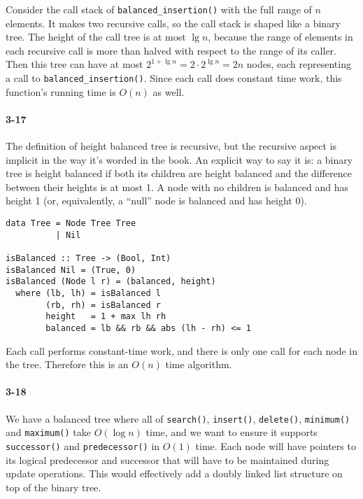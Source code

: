 \documentclass{report}
\begin{document}
Consider the call stack of \lstinline!balanced_insertion()! with the full range of $n$
elements. It makes two recursive calls, so the call stack is shaped like
a binary tree. The height of the call tree is at most $\lg n$, because the range of
elements in each recursive call is more than halved with respect to the range of its
caller. Then this tree can have at most $2^{1+\lg n} = 2\cdot 2^{\lg n} = 2n$ nodes, each
representing a call to \lstinline!balanced_insertion()!. Since each call does constant time work, this function's running time is $O(n)$ as well.

\paragraph{3-17} The definition of height balanced tree is recursive, but the recursive
aspect is implicit in the way it's worded in the book. An explicit way to say it is: a
binary tree is height balanced if both its children are height balanced and the difference
between their heights is at most 1. A node with no children is balanced and has height 1
(or, equivalently, a ``null'' node is balanced and has height 0).

\begin{lstlisting}
data Tree = Node Tree Tree
          | Nil

isBalanced :: Tree -> (Bool, Int)
isBalanced Nil = (True, 0)
isBalanced (Node l r) = (balanced, height)
  where (lb, lh) = isBalanced l
        (rb, rh) = isBalanced r
        height   = 1 + max lh rh
        balanced = lb && rb && abs (lh - rh) <= 1
\end{lstlisting}

Each call performs constant-time work, and there is only one call for each node in the
tree. Therefore this is an $O(n)$ time algorithm.

\paragraph{3-18} We have a balanced tree where all of \lstinline!search()!,
\lstinline!insert()!, \lstinline!delete()!, \lstinline!minimum()! and
\lstinline!maximum()! take $O(\log n)$ time, and we want to ensure it supports
\lstinline!successor()! and \lstinline!predecessor()! in $O(1)$ time. Each node will
have pointers to its logical predecessor and successor that will have to be
maintained during update operations. This would effectively add a doubly linked list
structure on top of the binary tree.
\end{document}
